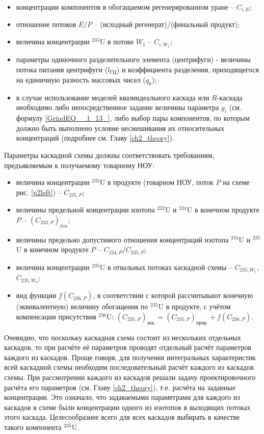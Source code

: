 \begin{itemize}
    \item концентрации компонентов в обогащаемом регенерированном уране -- $C_{i,{E}}$; 
    \item отношение потоков $E/P$ -- (исходный регенерат)/(финальный продукт);
    \item величина концентрации $^{235}$U в потоке $W_{1}$ -- $C_{i,{W_1}}$;
    \item параметры одиночного разделительного элемента (центрифуги) - величины потока питания центрифуги ($l_{ГЦ}$) и коэффициента разделения, приходящегося на единичную разность массовых чисел ($q_{0}$);
    \item в случае использование моделей квазиидеального каскада или $R$-каскада необходимо либо непосредственное задание величины параметра $g_i$ (см. формулу \ref{GrindEQ__1_13_}, либо выбор пары компонентов, по которым должно быть выполнено условие несмешивания их относительных концентраций (подробнее см. Главу \ref{ch2_theory}).
\end{itemize}

Параметры каскадной схемы должны соответствовать требованиям, предъявляемым к получаемому товарному НОУ:

\begin{itemize}
    \item величина концентрации $^{235}$U в продукте (товарном НОУ, поток $P$ на схеме рис. \ref{p2left}) -- $C_{235,{P}}$;
    \item величины предельной концентрации изотопа $^{232}$U и $^{234}$U в конечном продукте $P$ -- $(C_{232,{P}})_{lim}$;
    \item величины предельно допустимого отношения концентраций изотопа $^{234}$U и $^{235}$U в конечном продукте $P$ -- ${C_{234,{P}}}/{C_{235,{P}}}$;
    \item величина концентрации $^{235}$U в отвальных потоках каскадной схемы -- $C_{235,{W_1}}$, $C_{235,{W_0}}$;
    \item вид функции $f(C_{236,P})$, в соответствии с которой рассчитывают конечную (эквивалентную) величину обогащения по $^{235}$U в продукте, с учётом компенсации присутствия $^{236}$U:
    $(C_{235,P})_\textit{экв.}=(C_{235,P})_\textit{прир.}+f(C_{236,P})$.    
\end{itemize}

Очевидно, что поскольку каскадная схема состоит из нескольких отдельных каскадов, то при расчёте её параметров проводят отдельный расчёт параметров каждого из каскадов. Проще говоря, для получения интегральных характеристик всей каскадной схемы необходим последовательный расчёт каждого из каскадов схемы. При рассмотрении каждого из каскадов решали задачу проектировочного расчёта его параметров (см. Главу \ref{ch2_theory}), т.е. расчёта на заданные концентрации. Это означало, что задаваемыми параметрами для каждого из каскадов в схеме были концентрации одного из изотопов в выходящих потоках этого каскада. Целесообразнее всего для всех каскадов выбирать в качестве такого компонента $^{235}$U.

